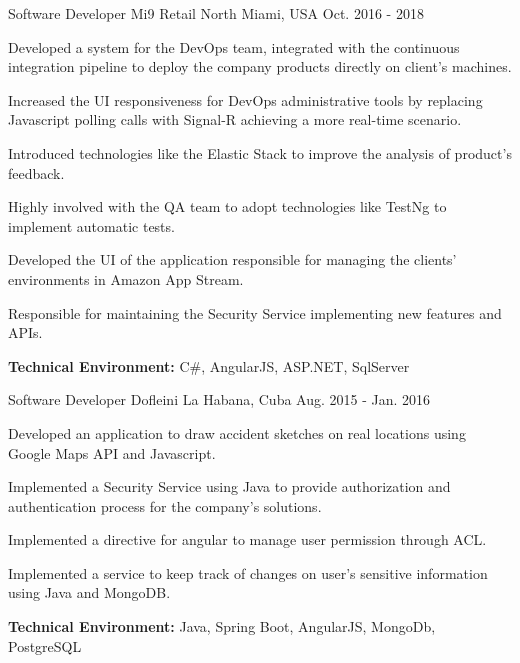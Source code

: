 \begin{cventries}
\workexperienceentry
{Software Developer} %
{Mi9 Retail} %
{North Miami, USA} %
{Oct. 2016 - 2018} %
{ %
\begin{cvitems}
    \item {Developed a system for the DevOps team, integrated with the continuous integration pipeline to deploy the company products directly on client's machines.}
    \item {Increased the UI responsiveness for DevOps administrative tools by replacing Javascript polling calls with Signal-R achieving a more real-time scenario.}
    \item {Introduced technologies like the Elastic Stack to improve the analysis of  product's feedback.}  
    \item {Highly involved with the QA team to adopt technologies like TestNg to implement automatic tests.}
    \item {Developed the UI of the application responsible for managing the clients' environments in Amazon App Stream.}
    \item {Responsible for maintaining the Security Service implementing new features and APIs.}
\end{cvitems}
}
{\textbf{Technical Environment:} C\#, AngularJS, ASP.NET, SqlServer}


\workexperienceentry
{Software Developer} %
{Dofleini} %
{La Habana, Cuba} %
{Aug. 2015 - Jan. 2016} %
{ %
\begin{cvitems}
	\item {Developed an application to draw accident sketches on real locations using Google Maps API and
		Javascript.}
	\item {Implemented a Security Service using Java to provide authorization and authentication
	process for the company's solutions.}
	\item {Implemented a directive for angular to manage user permission through ACL.}
	\item {Implemented a service to keep track of changes on user's sensitive information using Java and MongoDB.}
\end{cvitems}
}
{\textbf{Technical Environment:} Java, Spring Boot, AngularJS, MongoDb, PostgreSQL}




\end{cventries}
